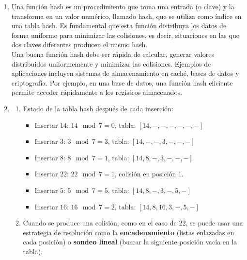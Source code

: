 \documentclass[12pt]{article}
\begin{document}
        \begin{enumerate}
            \item Una función hash es un procedimiento que toma una entrada (o clave) y la transforma en un valor numérico, llamado hash, que se utiliza como índice en una tabla hash. Es fundamental que esta función distribuya los datos de forma uniforme para minimizar las colisiones, es decir, situaciones en las que dos claves diferentes producen el mismo hash.\\
            Una buena función hash debe ser rápida de calcular, generar valores distribuidos uniformemente y minimizar las colisiones. Ejemplos de aplicaciones incluyen sistemas de almacenamiento en caché, bases de datos y criptografía. Por ejemplo, en una base de datos, una función hash eficiente permite acceder rápidamente a los registros almacenados.

            \item 
            \begin{enumerate}[label=\alph*.]
                \item Estado de la tabla hash después de cada inserción:
                \begin{itemize}
                    \item Insertar \(14\): \(14 \mod 7 = 0\), tabla: \([14, -, -, -, -, -, -]\)
                    \item Insertar \(3\): \(3 \mod 7 = 3\), tabla: \([14, -, -, 3, -, -, -]\)
                    \item Insertar \(8\): \(8 \mod 7 = 1\), tabla: \([14, 8, -, 3, -, -, -]\)
                    \item Insertar \(22\): \(22 \mod 7 = 1\), colisión en posición 1.
                    \item Insertar \(5\): \(5 \mod 7 = 5\), tabla: \([14, 8, -, 3, -, 5, -]\)
                    \item Insertar \(16\): \(16 \mod 7 = 2\), tabla: \([14, 8, 16, 3, -, 5, -]\)
                \end{itemize}

                \item Cuando se produce una colisión, como en el caso de \(22\), se puede usar una estrategia de resolución como la \textbf{encadenamiento} (listas enlazadas en cada posición) o \textbf{sondeo lineal} (buscar la siguiente posición vacía en la tabla).
            \end{enumerate}
            

\end{enumerate}
\end{document}
